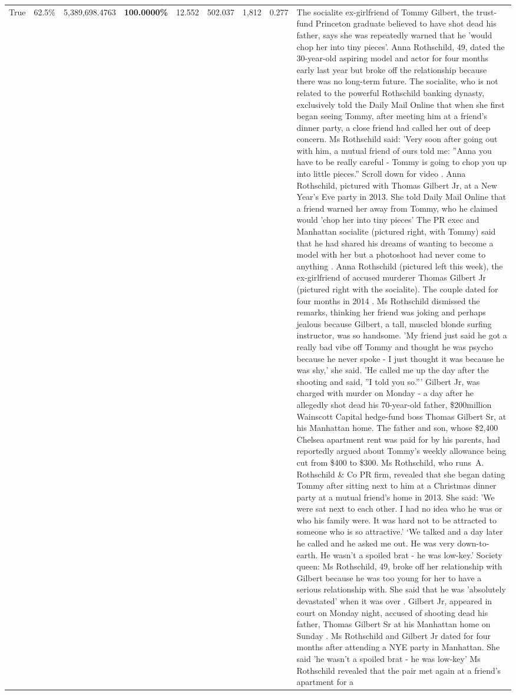 \begin{table}[H]
\begin{tabular}{lllrlllll}
True & 62.5\% & 5,389,698.4763 & \bfseries \color{red} 100.0000\% & 12.552 & 502.037 & 1,812 & 0.277 & The socialite ex-girlfriend of Tommy Gilbert, the trust-fund Princeton graduate believed to have shot dead his father, says she was repeatedly warned that he 'would chop her into tiny pieces'. Anna Rothschild, 49, dated the 30-year-old aspiring model and actor for four months early last year but broke off the relationship because there was no long-term future. The socialite, who is not related to the powerful Rothschild banking dynasty, exclusively told the Daily Mail Online that when she first began seeing Tommy, after meeting him at a friend's dinner party, a close friend had called her out of deep concern. Ms Rothschild said: 'Very soon after going out with him, a mutual friend of ours told me: ''Anna you have to be really careful - Tommy is going to chop you up into little pieces.'' Scroll down for video . Anna Rothschild, pictured with Thomas Gilbert Jr, at a New Year's Eve party in 2013. She told Daily Mail Online that a friend warned her away from Tommy, who he claimed would 'chop her into tiny pieces' The PR exec and Manhattan socialite (pictured right, with Tommy) said that he had shared his dreams of wanting to become a model with her but a photoshoot had never come to anything . Anna Rothschild (pictured left this week), the ex-girlfriend of accused murderer Thomas Gilbert Jr (pictured right with the socialite). The couple dated for four months in 2014 . Ms Rothschild dismissed the remarks, thinking her friend was joking and perhaps jealous because Gilbert, a tall, muscled blonde surfing instructor, was so handsome. 'My friend just said he got a really bad vibe off Tommy and thought he was psycho because he never spoke - I just thought it was because he was shy,' she said. 'He called me up the day after the shooting and said, ''I told you so.''' Gilbert Jr, was charged with murder on Monday - a day after he allegedly shot dead his 70-year-old father, \$200million Wainscott Capital hedge-fund boss Thomas Gilbert Sr, at his Manhattan home. The father and son, whose \$2,400 Chelsea apartment rent was paid for by his parents, had reportedly argued about Tommy's weekly allowance being cut from \$400 to \$300. Ms Rothschild, who runs A. Rothschild \& Co PR firm, revealed that she began dating Tommy after sitting next to him at a Christmas dinner party at a mutual friend's home in 2013. She said: 'We were sat next to each other. I had no idea who he was or who his family were. It was hard not to be attracted to someone who is so attractive.' ‘We talked and a day later he called and he asked me out. He was very down-to-earth. He wasn’t a spoiled brat - he was low-key.’ Society queen: Ms Rothschild, 49, broke off her relationship with Gilbert because he was too young for her to have a serious relationship with. She said that he was 'absolutely devastated' when it was over . Gilbert Jr, appeared in court on Monday night, accused of shooting dead his father, Thomas Gilbert Sr at his Manhattan home on Sunday . Ms Rothschild and Gilbert Jr dated for four months after attending a NYE party in Manhattan. She said 'he wasn't a spoiled brat - he was low-key' Ms Rothschild revealed that the pair met again at a friend’s apartment for a 
\end{tabular}
\end{table}
